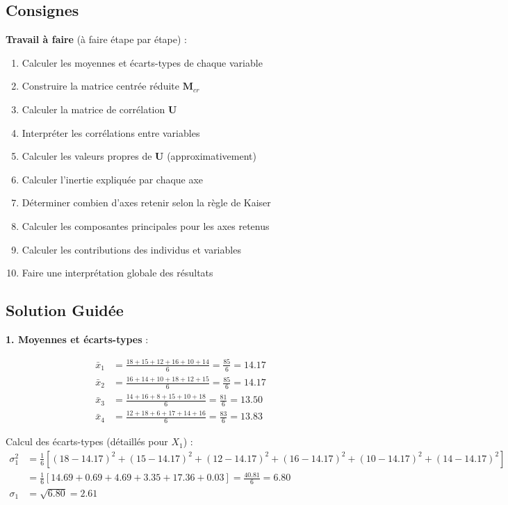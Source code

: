 \documentclass[11pt,a4paper]{article}
\begin{document}
\subsection{Consignes}

\textbf{Travail à faire} (à faire étape par étape) :

\begin{enumerate}
    \item Calculer les moyennes et écarts-types de chaque variable
    \item Construire la matrice centrée réduite $\mathbf{M}_{cr}$
    \item Calculer la matrice de corrélation $\mathbf{U}$
    \item Interpréter les corrélations entre variables
    \item Calculer les valeurs propres de $\mathbf{U}$ (approximativement)
    \item Calculer l'inertie expliquée par chaque axe
    \item Déterminer combien d'axes retenir selon la règle de Kaiser
    \item Calculer les composantes principales pour les axes retenus
    \item Calculer les contributions des individus et variables
    \item Faire une interprétation globale des résultats
\end{enumerate}

\subsection{Solution Guidée}

\textbf{1. Moyennes et écarts-types} :

\begin{align*}
\bar{x}_1 &= \frac{18 + 15 + 12 + 16 + 10 + 14}{6} = \frac{85}{6} = 14.17 \\
\bar{x}_2 &= \frac{16 + 14 + 10 + 18 + 12 + 15}{6} = \frac{85}{6} = 14.17 \\
\bar{x}_3 &= \frac{14 + 16 + 8 + 15 + 10 + 18}{6} = \frac{81}{6} = 13.50 \\
\bar{x}_4 &= \frac{12 + 18 + 6 + 17 + 14 + 16}{6} = \frac{83}{6} = 13.83
\end{align*}

Calcul des écarts-types (détaillés pour $X_1$) :
\begin{align*}
\sigma_1^2 &= \frac{1}{6}[(18-14.17)^2 + (15-14.17)^2 + (12-14.17)^2 + (16-14.17)^2 + (10-14.17)^2 + (14-14.17)^2] \\
&= \frac{1}{6}[14.69 + 0.69 + 4.69 + 3.35 + 17.36 + 0.03] = \frac{40.81}{6} = 6.80 \\
\sigma_1 &= \sqrt{6.80} = 2.61
\end{align*}
\end{document}

